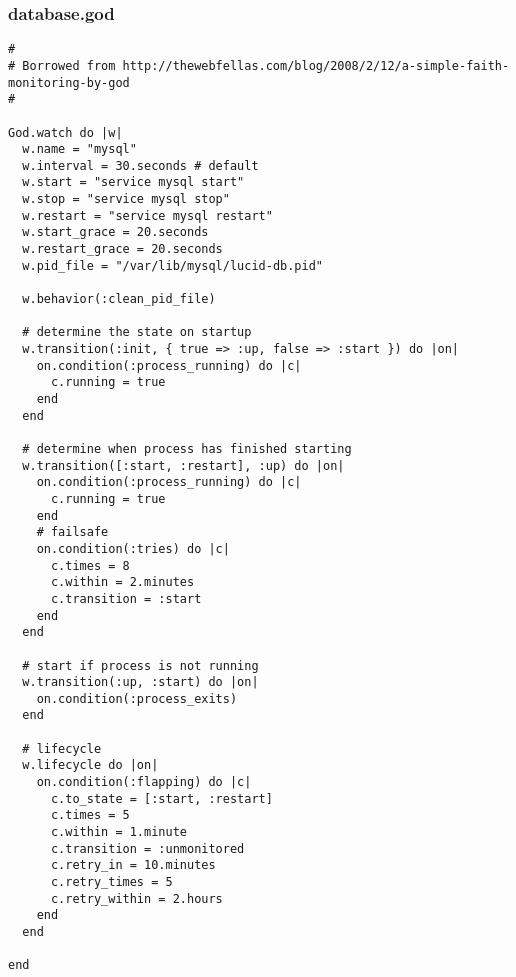 \subsubsection{database.god}

\begin{lstlisting}
#
# Borrowed from http://thewebfellas.com/blog/2008/2/12/a-simple-faith-monitoring-by-god
#

God.watch do |w|
  w.name = "mysql"
  w.interval = 30.seconds # default      
  w.start = "service mysql start"
  w.stop = "service mysql stop"
  w.restart = "service mysql restart"
  w.start_grace = 20.seconds
  w.restart_grace = 20.seconds
  w.pid_file = "/var/lib/mysql/lucid-db.pid"
    
  w.behavior(:clean_pid_file)

  # determine the state on startup    
  w.transition(:init, { true => :up, false => :start }) do |on|      
    on.condition(:process_running) do |c|        
      c.running = true     
    end    
  end     

  # determine when process has finished starting    
  w.transition([:start, :restart], :up) do |on|      
    on.condition(:process_running) do |c|        
      c.running = true      
    end       
    # failsafe      
    on.condition(:tries) do |c|        
      c.times = 8        
      c.within = 2.minutes        
      c.transition = :start      
    end    
  end     

  # start if process is not running    
  w.transition(:up, :start) do |on|      
    on.condition(:process_exits)    
  end     

  # lifecycle    
  w.lifecycle do |on|      
    on.condition(:flapping) do |c|        
      c.to_state = [:start, :restart]        
      c.times = 5        
      c.within = 1.minute        
      c.transition = :unmonitored        
      c.retry_in = 10.minutes        
      c.retry_times = 5        
      c.retry_within = 2.hours      
    end    
  end
  
end
\end{lstlisting}








